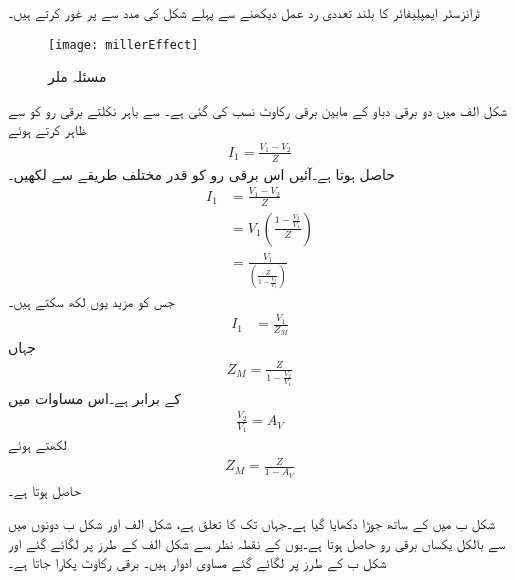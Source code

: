 ٹرانزسٹر ایمپلیفائر کا بلند تعددی رد عمل دیکھنے سے پہلے شکل  کی مدد سے  پر غور کرتے ہیں۔
\begin{figure}
\centering
\texttt{[image: millerEffect]}
\caption{مسئلہ ملر}
\label{شکل_تعددی_ردعمل_مسئلہ_ملر}
\end{figure}
شکل  الف میں دو برقی دباو کے مابین برقی رکاوٹ  نسب کی گئی ہے۔ سے باہر نکلتے برقی رو کو  سے ظاہر کرتے ہوئے
\begin{align*}
I_1=\frac{V_1-V_2}{Z}
\end{align*}
حاصل ہوتا ہے۔آئیں اس برقی رو کو قدر مختلف طریقے سے لکھیں۔
\begin{align*}
I_1 &=\frac{V_1-V_2}{Z}\\
&=V_1 \left(\frac{1-\frac{V_2}{V_1}}{Z} \right)\\
&=\frac{V_1}{\left(\frac{Z}{1-\frac{V_2}{V_1}} \right)}
\end{align*}
جس کو مزید یوں لکھ سکتے ہیں۔
\begin{align}
I_1 &=\frac{V_1}{Z_M}
\end{align}
جہاں
\begin{align}
Z_M=\frac{Z}{1-\frac{V_2}{V_1}}
\end{align}
کے برابر ہے۔اس مساوات میں
\begin{align}
\frac{V_2}{V_1}=A_V
\end{align}
لکھتے ہوئے
\begin{align} \label{مساوات_تعدد_ردعمل_ملر_رکاوٹ}
Z_M=\frac{Z}{1-A_V}
\end{align}
حاصل ہوتا ہے۔

شکل  ب میں  کے ساتھ  جوڑا دکھایا گیا ہے۔جہاں تک  کا تعلق ہے، شکل  الف اور شکل  ب دونوں میں  سے بالکل یکساں  برقی رو حاصل ہوتا ہے۔یوں  کے نقطہ نظر سے شکل  الف کے طرز پر لگائے گئے  اور شکل  ب کے طرز پر لگائے گئے   مساوی ادوار ہیں۔  برقی رکاوٹ پکارا جاتا ہے۔

